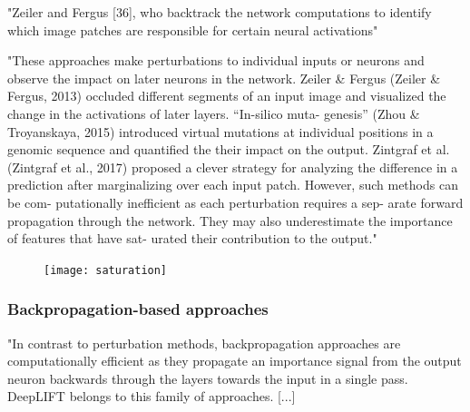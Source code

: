		"Zeiler and Fergus [36], who backtrack the network computations to identify which image patches are responsible for certain neural activations" \cite{Mahendran2015}
		
		"These approaches make perturbations to individual inputs or neurons and observe the impact on later neurons in the network. Zeiler \& Fergus (Zeiler \& Fergus, 2013) occluded different segments of an input image and visualized the change in the activations of later layers. “In-silico muta- genesis” (Zhou \& Troyanskaya, 2015) introduced virtual mutations at individual positions in a genomic sequence and quantified the their impact on the output. Zintgraf et al. (Zintgraf et al., 2017) proposed a clever strategy for analyzing the difference in a prediction after marginalizing over each input patch. However, such methods can be com- putationally inefficient as each perturbation requires a sep- arate forward propagation through the network. They may also underestimate the importance of features that have sat- urated their contribution to the output." \cite{Shrikumar2017}
		\begin{figure}[h]
			\centering
			\texttt{[image: saturation]}
		\end{figure}

		\subsubsection{Backpropagation-based approaches}
		"In contrast to perturbation methods, backpropagation approaches are computationally efficient as they propagate an importance signal from the output neuron backwards through the layers towards the input in a single pass.
		DeepLIFT belongs to this family of approaches.
		[...]
		
